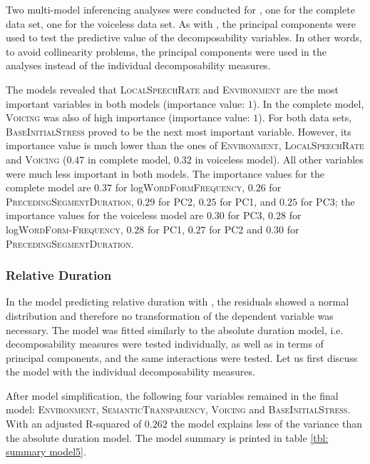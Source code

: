 Two multi-model inferencing analyses were conducted for , one for the complete data set, one for the voiceless data set. As with , the principal components were used to test the predictive value of the decomposability variables. In other words, to avoid collinearity problems, the principal components were used in the analyses instead of the individual decomposability measures. 

The models revealed that \textsc{LocalSpeechRate} and \textsc{Environment}  are the most important variables in both models (importance value: $1$). In the complete model, \textsc{Voicing} was also of high importance (importance value: $1$). 
For both data sets, \textsc{BaseInitialStress} proved to be the next most important variable. However, its importance value is much lower than the ones of \textsc{Environment}, \textsc{LocalSpeechRate} and \textsc{Voicing} ($0.47$ in complete model, $0.32$ in voiceless model).
 All other variables were much less important in both models. 
The importance values for the complete model are $0.37$ for log\textsc{WordFormFrequency},  $0.26$ for \textsc{PrecedingSegmentDuration}, $0.29$ for \textsc{PC2}, $0.25$ for \textsc{PC1},  and $0.25$ for \textsc{PC3}; 
 the importance values for the voiceless model are $0.30$ for \textsc{PC3}, $0.28$ for log\textsc{WordForm-Frequency}, $0.28$ for \textsc{PC1}, $0.27$ for \textsc{PC2} and $0.30$ for \textsc{PrecedingSegmentDuration}.



\subsubsection{Relative Duration}

In the model predicting relative duration with , the residuals showed a normal distribution and therefore no transformation of the dependent variable was necessary. The model was fitted similarly to the absolute duration model, i.e. decomposability measures were tested individually, as well as in terms of principal components, and the same interactions were tested. Let us first discuss the model with the individual decomposability measures.

After model simplification, the following four variables remained in the final model: \textsc{Environment}, \textsc{SemanticTransparency}, \textsc{Voicing} and \textsc{BaseInitialStress}. With an adjusted R-squared of $0.262$ the model explains less of the variance than the absolute duration model. The model summary is printed in table \ref{tbl: summary model5}.
  

